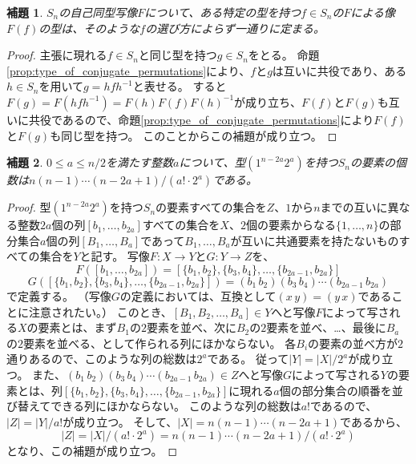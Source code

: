 \documentclass[11pt]{jarticle}
\newtheorem{lemma}{補題}
\begin{document}
\begin{lemma}
\label{lem:type_of_image_is_function_of_type}
$S_n$の自己同型写像$F$について、ある特定の型を持つ$f \in S_n$の$F$による像$F(f)$の型は、そのような$f$の選び方によらず一通りに定まる。
\end{lemma}
\begin{proof}
主張に現れる$f \in S_n$と同じ型を持つ$g \in S_n$をとる。
命題\ref{prop:type_of_conjugate_permutations}により、$f$と$g$は互いに共役であり、ある$h \in S_n$を用いて$g = hfh^{-1}$と表せる。
すると$F(g) = F(hfh^{-1}) = F(h)F(f)F(h)^{-1}$が成り立ち、$F(f)$と$F(g)$も互いに共役であるので、命題\ref{prop:type_of_conjugate_permutations}により$F(f)$と$F(g)$も同じ型を持つ。
このことからこの補題が成り立つ。
\end{proof}

\begin{lemma}
\label{lem:number_of_permutation_with_type}
$0 \leq a \leq n/2$を満たす整数$a$について、型$(1^{n-2a}2^a)$を持つ$S_n$の要素の個数は$n(n-1) \cdots (n-2a+1) / (a! \cdot 2^a)$である。
\end{lemma}
\begin{proof}
型$(1^{n-2a}2^a)$を持つ$S_n$の要素すべての集合を$Z$、$1$から$n$までの互いに異なる整数$2a$個の列$[b_1,\dots,b_{2a}]$すべての集合を$X$、$2$個の要素からなる$\{1,\dots,n\}$の部分集合$a$個の列$[B_1,\dots,B_a]$であって$B_1,\dots,B_a$が互いに共通要素を持たないものすべての集合を$Y$と記す。
写像$F \colon X \to Y$と$G \colon Y \to Z$を、
\begin{displaymath}
F([b_1,\dots,b_{2a}]) = [\{b_1,b_2\},\{b_3,b_4\},\dots,\{b_{2a-1},b_{2a}\}]
\end{displaymath}
\begin{displaymath}
G([\{b_1,b_2\},\{b_3,b_4\},\dots,\{b_{2a-1},b_{2a}\}]) = (b_1\,b_2)(b_3\,b_4) \cdots (b_{2a-1}\,b_{2a})
\end{displaymath}
で定義する。
（写像$G$の定義においては、互換として$(x\,y) = (y\,x)$であることに注意されたい。）
このとき、$[B_1,B_2,\dots,B_a] \in Y$へと写像$F$によって写される$X$の要素とは、まず$B_1$の$2$要素を並べ、次に$B_2$の$2$要素を並べ、…、最後に$B_a$の$2$要素を並べる、として作られる列にほかならない。
各$B_i$の要素の並べ方が$2$通りあるので、このような列の総数は$2^a$である。
従って$|Y| = |X| / 2^a$が成り立つ。
また、$(b_1\,b_2)(b_3\,b_4) \cdots (b_{2a-1}\,b_{2a}) \in Z$へと写像$G$によって写される$Y$の要素とは、列$[\{b_1,b_2\},\{b_3,b_4\},\dots,\{b_{2a-1},b_{2a}\}]$に現れる$a$個の部分集合の順番を並び替えてできる列にほかならない。
このような列の総数は$a!$であるので、$|Z| = |Y| / a!$が成り立つ。
そして、$|X| = n(n-1) \cdots (n-2a+1)$であるから、
\begin{displaymath}
|Z| = |X| / (a! \cdot 2^a) = n(n-1) \cdots (n-2a+1) / (a! \cdot 2^a)
\end{displaymath}
となり、この補題が成り立つ。
\end{proof}
\end{document}
